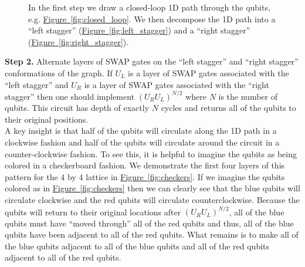 \documentclass[superscriptaddress,aps,pra,nofootinbib,notitlepage,10pt,longbibliography]{revtex4-1}
\newcommand{\fig}[1]{\hyperref[fig:#1]{Figure~\ref*{fig:#1}}}
\begin{document}
\begin{figure}[h]
{}
\caption{In the first step we draw a closed-loop 1D path through the qubits, e.g. \fig{closed_loop}. We then decompose the 1D path into a ``left stagger'' (\fig{left_stagger}) and a ``right stagger'' (\fig{right_stagger}).}
\label{fig:paths}
\end{figure}

{\bf Step 2.} Alternate layers of SWAP gates on the ``left stagger'' and ``right stagger'' conformations of the graph. If $U_L$ is a layer of SWAP gates associated with the ``left stagger'' and $U_R$ is a layer of SWAP gates associated with the ``right stagger'' then one should implement $(U_R U_L)^{N / 2}$ where $N$ is the number of qubits. This circuit has depth of exactly $N$ cycles and returns all of the qubits to their original positions.\\

A key insight is that half of the qubits will circulate along the 1D path in a clockwise fashion and half of the qubits will circulate around the circuit in a counter-clockwise fashion. To see this, it is helpful to imagine the qubits as being colored in a checkerboard fashion. We demonstrate the first four layers of this pattern for the 4 by 4 lattice in \fig{checkers}. If we imagine the qubits colored as in \fig{checkers} then we can clearly see that the blue qubits will circulate clockwise and the red qubits will circulate counterclockwise. Because the qubits will return to their original locations after $(U_R U_L)^{N / 2}$, all of the blue qubits must have ``moved through'' all of the red qubits and thus, all of the blue qubits have been adjacent to all of the red qubits. What remains is to make all of the blue qubits adjacent to all of the blue qubits and all of the red qubits adjacent to all of the red qubits.\\
\end{document}
